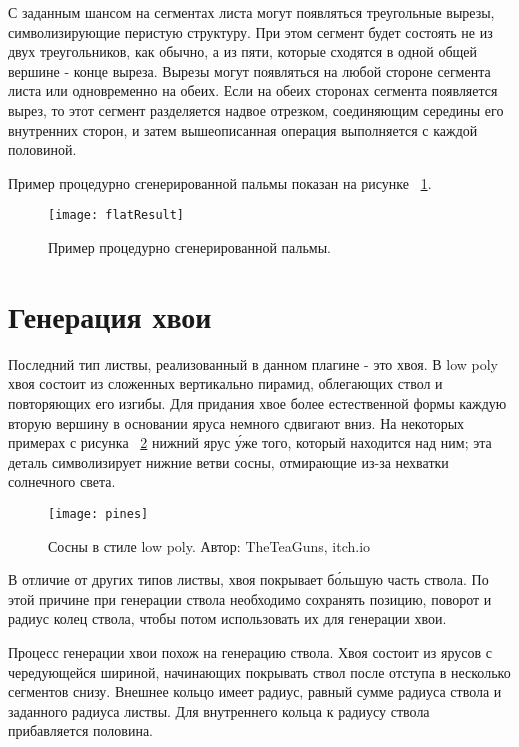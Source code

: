 С заданным шансом на сегментах листа могут появляться треугольные вырезы, символизирующие перистую структуру. При этом сегмент будет состоять не из двух треугольников, как обычно, а из пяти, которые сходятся в одной общей вершине - конце выреза. Вырезы могут появляться на любой стороне сегмента листа или одновременно на обеих. Если на обеих сторонах сегмента появляется вырез, то этот сегмент разделяется надвое отрезком, соединяющим середины его внутренних сторон, и затем вышеописанная операция выполняется с каждой половиной. 

Пример процедурно сгенерированной пальмы показан на рисунке ~\ref{fig:flatResult}.

\begin{figure}[!htb]
    \centering
    \texttt{[image: flatResult]}
    \caption{Пример процедурно сгенерированной пальмы.}
    \label{fig:flatResult}
\end{figure}

\section{Генерация хвои}
Последний тип листвы, реализованный в данном плагине - это хвоя. В low poly хвоя состоит из сложенных вертикально пирамид, облегающих ствол и повторяющих его изгибы. Для придания хвое более естественной формы каждую вторую вершину в основании яруса немного сдвигают вниз. На некоторых примерах с рисунка ~\ref{fig:pines} нижний ярус \'уже того, который находится над ним; эта деталь символизирует нижние ветви сосны, отмирающие из-за нехватки солнечного света.  

\begin{figure}[!htb]
    \centering
    \texttt{[image: pines]}
    \caption{Сосны в стиле low poly. Автор: TheTeaGuns, itch.io}
    \label{fig:pines}
\end{figure}

В отличие от других типов листвы, хвоя покрывает б\'ольшую часть ствола. По этой причине при генерации ствола необходимо сохранять позицию, поворот и радиус колец ствола, чтобы потом использовать их для генерации хвои. 

Процесс генерации хвои похож на генерацию ствола. Хвоя состоит из ярусов с чередующейся шириной, начинающих покрывать ствол после отступа в несколько сегментов снизу. Внешнее кольцо имеет радиус, равный сумме радиуса ствола и заданного радиуса листвы. Для внутреннего кольца к радиусу ствола прибавляется половина. 

